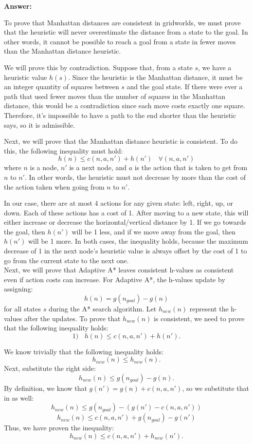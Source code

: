 \documentclass{article}
\begin{document}
{\color{blue} \textbf{Answer:}

To prove that Manhattan distances are consistent in gridworlds, we must prove that the heuristic will never overestimate the distance from a state to the goal. In other words, it cannot be possible to reach a goal from a state in fewer moves than the Manhattan distance heuristic. 

We will prove this by contradiction. Suppose that, from a state $s$, we have a heuristic value $h(s)$. Since the heuristic is the Manhattan distance, it must be an integer quantity of squares between $s$ and the goal state. If there were ever a path that used fewer moves than the number of squares in the Manhattan distance, this would be a contradiction since each move costs exactly one square. Therefore, it's impossible to have a path to the end shorter than the heuristic says, so it is admissible.

Next, we will prove that the Manhattan distance heuristic is consistent. To do this, the following inequality must hold:
$$h(n) \le c(n, a, n') + h(n')~~~~\forall (n, a, n')$$
where $n$ is a node, $n'$ is a next node, and $a$ is the action that is taken to get from $n$ to $n'$. In other words, the heuristic must not decrease by more than the cost of the action taken when going from $n$ to $n'$.

In our case, there are at most 4 actions for any given state: left, right, up, or down. Each of these actions has a cost of 1. After moving to a new state, this will either increase or decrease the horizontal/vertical distance by 1. If we go towards the goal, then $h(n')$ will be 1 less, and if we move away from the goal, then $h(n')$ will be 1 more. In both cases, the inequality holds, because the maximum decrease of 1 in the next node's heuristic value is always offset by the cost of 1 to go from the current state to the next one.\\

Next, we will prove that Adaptive A* leaves consistent h-values as consistent even if action costs can increase. For Adaptive A*, the h-values update by assigning:
$$h(n) = g(n_{goal}) - g(n)$$
for all states $s$ during the A* search algorithm. Let $h_{new}(n)$ represent the h-values after the updates. To prove that $h_{new}(n)$ is consistent, we need to prove that the following inequality holds:
$$1) ~~~~h(n) \le c(n, a, n') + h(n').$$

We know trivially that the following inequality holds:
$$h_{new}(n) \le h_{new}(n).$$
Next, substitute the right side:
$$h_{new}(n) \le g(n_{goal}) - g(n).$$
By definition, we know that $g(n') = g(n) + c(n, a, n')$, so we substitute that in as well:
$$h_{new}(n) \le g(n_{goal}) - (g(n') - c(n, a, n'))$$
$$h_{new}(n) \le c(n, a, n') + g(n_{goal}) - g(n')$$
Thus, we have proven the inequality: 
$$h_{new}(n) \le c(n, a, n') + h_{new}(n').$$

}
\end{document}
